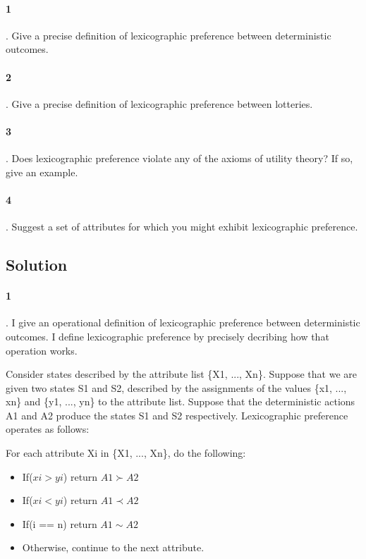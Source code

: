 \documentclass[10pt]{article}
\begin{document}
   \paragraph{1}. Give a precise definition of lexicographic preference between deterministic outcomes.

   \paragraph{2}. Give a precise definition of lexicographic preference between lotteries.

   \paragraph{3}. Does lexicographic preference violate any of the axioms of utility theory? If so, give an example.

   \paragraph{4}. Suggest a set of attributes for which you might exhibit lexicographic preference.

\subsection{Solution}

   \paragraph{1}. I give an operational definition of lexicographic preference between deterministic outcomes. I define lexicographic preference by precisely decribing how that operation works.

Consider states described by the attribute list \{X1, ..., Xn\}. Suppose that we are given two states S1 and S2, described by the assignments of the values \{x1, ..., xn\} and \{y1, ..., yn\} to the attribute list. Suppose that the deterministic actions A1 and A2 produce the states S1 and S2 respectively. Lexicographic preference operates as follows:


For each attribute Xi in \{X1, ..., Xn\}, do the following:
\begin{itemize}
 \item If($xi > yi$) return $A1 \succ A2$
 \item If($xi < yi$) return $A1 \prec A2$
 \item If(i == n) return $A1 \sim A2$
 \item Otherwise, continue to the next attribute.
\end{itemize}
\end{document}
